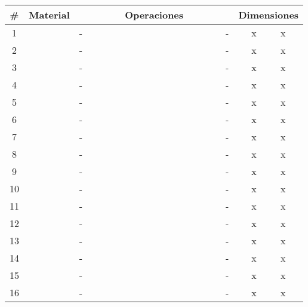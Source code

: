 		\begin{center}
			\begin{tabular}{|c|c|c|c|c|c|c|c|c|c|c|c|c|c|c|c|c|c|c|c|c|c|c|c|}
				\hline
				\# & \multicolumn{2}{c|}{Material} & &\multicolumn{14}{c|}{Operaciones} & & \multicolumn{5}{c|}{Dimensiones} \\
				\hline
				1 & \hspace{0.5cm} & \hspace{0.5cm} & - & & & & & & & & & & & & & & & - & \hspace{1cm} & x & \hspace{1cm} & x & \hspace{1cm} \\
				\hline
				2 & & & - & & & & & & & & & & & & & & & - & & x & & x & \\
				\hline
				3 & & & - & & & & & & & & & & & & & & & - & & x & & x & \\
				\hline
				4 & & & - & & & & & & & & & & & & & & & - & & x & & x & \\
				\hline
				5 & & & - & & & & & & & & & & & & & & & - & & x & & x & \\
				\hline
				6 & & & - & & & & & & & & & & & & & & & - & & x & & x & \\
				\hline
				7 & & & - & & & & & & & & & & & & & & & - & & x & & x & \\
				\hline
				8 & & & - & & & & & & & & & & & & & & & - & & x & & x & \\
				\hline
				9 & & & - & & & & & & & & & & & & & & & - & & x & & x & \\
				\hline
				10 & & & - & & & & & & & & & & & & & & & - & & x & & x & \\
				\hline
			 	11 & & & - & & & & & & & & & & & & & & & - & & x & & x & \\
				\hline
				12 & & & - & & & & & & & & & & & & & & & - & & x & & x & \\
				\hline
				13 & & & - & & & & & & & & & & & & & & & - & & x & & x & \\
				\hline
				14 & & & - & & & & & & & & & & & & & & & - & & x & & x & \\
				\hline
				15 & & & - & & & & & & & & & & & & & & & - & & x & & x & \\
				\hline
				16 & & & - & & & & & & & & & & & & & & & - & & x & & x & \\
				\hline
			\end{tabular}
		\end{center}



